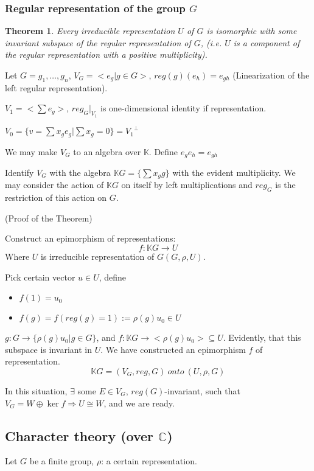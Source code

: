 \documentclass[12pt, a4paper]{article}
\newtheorem{theorem}{Theorem}[section]
\theoremstyle{definition}
\begin{document}
\subsubsection{Regular representation of the group \texorpdfstring{$G$}{group}}
\begin{theorem}
    Every irreducible representation $U$ of $G$ is isomorphic with some invariant subspace of
    the regular representation of $G$, (i.e. $U$ is a component of the regular representation
    with a positive multiplicity).
\end{theorem}
Let $G={g_1,\ldots,g_n}$, $V_G = <e_g |g\in G>$, $reg(g)(e_h)  =e_{gh}$ (Linearization of the
left regular representation).
\par
$V_1=<\sum e_g> $, $reg_G|_{V_1}$ is one-dimensional identity if representation.
\par
$V_0=\{v=\sum x_g e_g | \sum x_g =0 \} = {V_1}^\perp $
\par
We may make $V_G$ to an algebra over $\mathbb{K}$. Define $e_g e_h = e_{gh} $
\par
Identify $V_G$ with the algebra $\mathbb{K}G=\{\sum x_g g\} $ with the evident multiplicity. 
We may consider the action of $\mathbb{K}G$ on itself by left multiplications and $reg_G$ is
the restriction of this action on $G$.
\par
(Proof of the Theorem)
\par
Construct an epimorphism of representations:
\[f:\mathbb{K}G\rightarrow U \]
Where $U$ is irreducible representation of $G(G,\rho, U)$.
\par
Pick certain vector $u\in U$, define 
\begin{itemize}[label={}]
    \item $f(1)= u_0$
    \item $f(g) = f(reg(g)=1):=\rho(g)u_0\in U $
\end{itemize}
\par $g:G\rightarrow \{\rho(g)u_0 |g\in G\}$, and $f:\mathbb{K}G\rightarrow<\rho(g)u_0>
\subseteq U$. Evidently, that this subspace is invariant in $U$. We have constructed an 
epimorphism $f$ of representation.
\[\mathbb{K}G = (V_G ,reg,G)\ onto\ (U,\rho, G)\]
\par
In this situation, $\exists $ some $E\in V_G $, $reg(G)$-invariant, such that 
$V_G = W\oplus \ker f \Rightarrow U\cong W$, and we are ready.

\subsection{Character theory (over \texorpdfstring{$\mathbb{C}$}{ CmpNum})}
Let $G$ be a finite group, $\rho$: a certain representation.
\par
\end{document}

